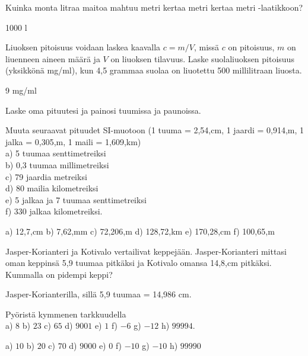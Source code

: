 \begin{tehtavasivu}
\begin{tehtava}
Kuinka monta litraa maitoa mahtuu metri kertaa metri kertaa metri -laatikkoon?
	\begin{vastaus}
	1000 l
	\end{vastaus}
\end{tehtava}

\begin{tehtava}
Liuoksen pitoisuus voidaan laskea kaavalla $c=m/V$, missä $c$ on pitoisuus, $m$ on liuenneen aineen määrä ja $V$ on liuoksen tilavuus.
Laske suolaliuoksen pitoisuus (yksikkönä mg/ml), kun 4,5 grammaa suolaa on liuotettu 500 millilitraan liuosta.
\begin{vastaus}
9 mg/ml
\end{vastaus}
\end{tehtava}

\begin{tehtava}
Laske oma pituutesi ja painosi tuumissa ja paunoissa.
\end{tehtava}

\begin{tehtava}
Muuta seuraavat pituudet SI-muotoon (1 tuuma = 2,54,cm, 1 jaardi = 0,914,m, 1 jalka = 0,305,m, 1 maili = 1,609,km) \\
a) 5 tuumaa senttimetreiksi \\
b) 0,3 tuumaa millimetreiksi \\
c) 79 jaardia metreiksi \\
d) 80 mailia kilometreiksi \\
e) 5 jalkaa ja 7 tuumaa senttimetreiksi \\
f) 330 jalkaa kilometreiksi.
\begin{vastaus}
a) 12,7,cm \qquad
b) 7,62,mm \qquad
c) 72,206,m \qquad
d) 128,72,km \qquad
e) 170,28,cm \qquad
f) 100,65,m
\end{vastaus}
\end{tehtava}

\begin{tehtava}
Jasper-Korianteri ja Kotivalo vertailivat keppejään. Jasper-Korianteri mittasi oman keppinsä 5,9 tuumaa pitkäksi ja Kotivalo omansa 14,8,cm pitkäksi. Kummalla on pidempi keppi?
\begin{vastaus}
Jasper-Korianterilla, sillä 5,9 tuumaa = 14,986 cm.
\end{vastaus}
\end{tehtava}

\begin{tehtava}
Pyöristä kymmenen tarkkuudella \\
a) $8$ \qquad
b) $23$ \qquad
c) $65$ \qquad
d) $9001$ \qquad
e) $1$ \qquad
f) $-6$ \qquad
g) $-12$ \qquad
h) $99994$.
\begin{vastaus}
a) $10$ \qquad
b) $20$ \qquad
c) $70$ \qquad
d) $9000$ \qquad
e) $0$ \qquad
f) $-10$ \qquad
g) $-10$ \qquad
h) $99990$
\end{vastaus}
\end{tehtava}


\end{tehtavasivu}
